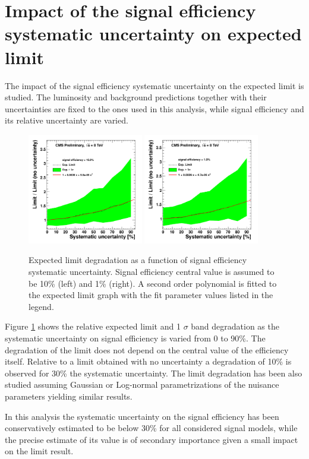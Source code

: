\section{Impact of the signal efficiency systematic uncertainty on expected limit}

The impact of the signal efficiency systematic uncertainty on the expected limit is studied. 
The luminosity and background predictions together with their uncertainties are fixed to the ones used 
in this analysis, while signal efficiency and its relative uncertainty are varied.


\begin{figure}[htbp]
\centering
\includegraphics[width=0.45\textwidth]{plots/degradation/10percent.pdf}
\includegraphics[width=0.45\textwidth]{plots/degradation/1percent.pdf}
\caption{Expected limit degradation as a function of signal efficiency systematic uncertainty.
Signal efficiency central value is assumed to be 10\% (left) and 1\% (right). A second order polynomial
is fitted to the expected limit graph with the fit parameter values listed in the legend.\label{fig:degradation}}
\end{figure}

Figure \ref{fig:degradation} shows the relative expected limit and 1 $\sigma$ band degradation as the 
systematic uncertainty on signal efficiency is varied from 0 to 90\%. The degradation of the limit does not depend
on the central value of the efficiency itself. Relative to a limit obtained with no uncertainty a 
degradation of 10\% is observed for 30\% the systematic uncertainty. The limit degradation has been also studied 
assuming Gaussian or Log-normal parametrizations of the nuisance parameters yielding similar results.

In this analysis the systematic uncertainty on the signal efficiency has been conservatively 
estimated to be below 30\% for all considered signal models, while
the precise estimate of its value is of secondary importance given a small impact on the limit result.
      

